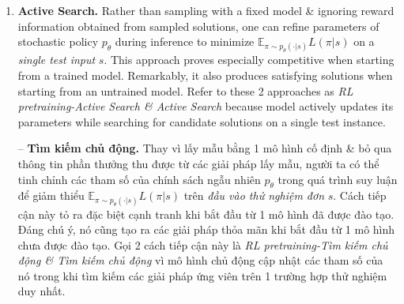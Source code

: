 \documentclass{article}
\begin{document}
\begin{itemize}
\begin{enumerate}
        {\bf Sampling.} Our 1st approach is simply to sample multiple candidate tours from our stochastic policy $p_\theta(\cdot|s)$ \& select shortest one. In contrast to heuristic solvers, do not enforce our model to sample different tours during process. However, can control diversity of sampled tours with a temperature hyperparameter when sampling from our non-parametric softmax (Appendix A.2). This sampling process yields significant improvements over greedy decoding, which always selects index with largest probability. Also considered perturbing pointing mechanism with random noise \& greedily decoding from obtained modified policy, similarly to (Cho, 2016), but this proves less effective than sampling in our experiments.
        
        -- {\bf Lấy mẫu.} Cách tiếp cận đầu tiên của chúng tôi chỉ đơn giản là lấy mẫu nhiều chuyến đi ứng viên từ chính sách ngẫu nhiên $p_\theta(\cdot|s)$ \& chọn chuyến đi ngắn nhất. Trái ngược với các trình giải quyết theo phương pháp heuristic, không áp đặt mô hình của chúng tôi để lấy mẫu các chuyến đi khác nhau trong quá trình. Tuy nhiên, có thể kiểm soát tính đa dạng của các chuyến đi được lấy mẫu bằng siêu tham số nhiệt độ khi lấy mẫu từ softmax không tham số của chúng tôi (Phụ lục A.2). Quá trình lấy mẫu này mang lại những cải tiến đáng kể so với giải mã tham lam, giải mã này luôn chọn chỉ mục có xác suất lớn nhất. Cũng được xem xét cơ chế trỏ nhiễu với nhiễu ngẫu nhiên \& giải mã tham lam từ chính sách đã sửa đổi thu được, tương tự như (Cho, 2016), nhưng điều này tỏ ra kém hiệu quả hơn so với lấy mẫu trong các thí nghiệm của chúng tôi.
        \item {\bf Active Search.} Rather than sampling with a fixed model \& ignoring reward information obtained from sampled solutions, one can refine parameters of stochastic policy $p_\theta$ during inference to minimize $\mathbb{E}_{\pi\sim p_\theta(\cdot|s)} L(\pi|s)$ on a {\it single test input} $s$. This approach proves especially competitive when starting from a trained model. Remarkably, it also produces satisfying solutions when starting from an untrained model. Refer to these 2 approaches as {\it RL pretraining-Active Search \& Active Search} because model actively updates its parameters while searching for candidate solutions on a single test instance.
        
        -- {\bf Tìm kiếm chủ động.} Thay vì lấy mẫu bằng 1 mô hình cố định \& bỏ qua thông tin phần thưởng thu được từ các giải pháp lấy mẫu, người ta có thể tinh chỉnh các tham số của chính sách ngẫu nhiên $p_\theta$ trong quá trình suy luận để giảm thiểu $\mathbb{E}_{\pi\sim p_\theta(\cdot|s)} L(\pi|s)$ trên {\it đầu vào thử nghiệm đơn} $s$. Cách tiếp cận này tỏ ra đặc biệt cạnh tranh khi bắt đầu từ 1 mô hình đã được đào tạo. Đáng chú ý, nó cũng tạo ra các giải pháp thỏa mãn khi bắt đầu từ 1 mô hình chưa được đào tạo. Gọi 2 cách tiếp cận này là {\it RL pretraining-Tìm kiếm chủ động \& Tìm kiếm chủ động} vì mô hình chủ động cập nhật các tham số của nó trong khi tìm kiếm các giải pháp ứng viên trên 1 trường hợp thử nghiệm duy nhất.
        

\end{enumerate}
\end{itemize}
\end{document}
